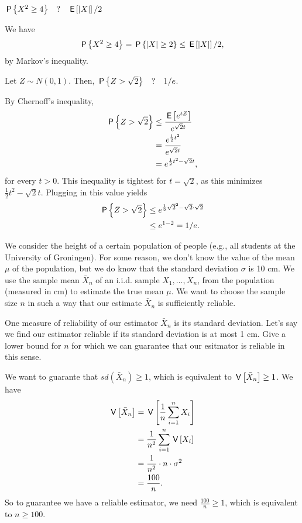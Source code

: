 \documentclass[lectures]{subfiles}
\begin{document}
\begin{exercise}
$\P{X^2 \geq 4} \quad?\quad \E{|X|}/2$
\begin{solution}
We have
\begin{align}
    \P{X^2 \geq 4} = \P{|X| \geq 2} \leq \E{|X|}/2,
\end{align}
by Markov's inequality.
\end{solution}
\end{exercise}



\begin{exercise}
Let $Z \sim N(0,1)$. Then, $\P{Z > \sqrt{2}} \quad?\quad 1/e$.
\begin{solution}
By Chernoff's inequality,
\begin{align}
    \P{Z > \sqrt{2}} &\leq \frac{\E{e^{tZ}}}{e^{\sqrt{2}t}} \\
    &= \frac{e^{\frac{1}{2}t^2}}{e^{\sqrt{2}t}} \\
    &= e^{\frac{1}{2}t^2 - \sqrt{2}t},
\end{align}
for every $t > 0$. This inequality is tightest for $t = \sqrt{2}$, as this minimizes $\frac{1}{2}t^2 - \sqrt{2}t$. Plugging in this value yields
\begin{align}
    \P{Z > \sqrt{2}} &\leq e^{\frac{1}{2}\sqrt{2}^2 - \sqrt{2}\cdot \sqrt{2}}\\
    &\leq e^{1 - 2} = 1/e.
\end{align}
\end{solution}
\end{exercise}


We consider the height of a certain population of people (e.g., all students at the University of Groningen). For some reason, we don't know the value of the mean $\mu$ of the population, but we do know that the standard deviation $\sigma$ is 10 cm. We use the sample mean $\bar{X}_n$ of an i.i.d. sample $X_1, \ldots, X_n$, from the population (measured in cm) to estimate the true mean $\mu$.  We want to choose the sample size $n$ in such a way that our estimate $\bar{X}_n$ is sufficiently reliable.

\begin{exercise}
One measure of reliability of our estimator $\bar{X}_n$ is its standard deviation. Let's say we find our estimator reliable if its standard deviation is at most 1 cm. Give a lower bound for $n$ for which we can guarantee that our esitmator is reliable in this sense.
\begin{solution}
We want to guarante that $sd(\bar{X}_n) \geq 1$, which is equivalent to $\V{\bar{X}_n} \geq 1$. We have
\begin{align}
    \V{\bar{X}_n} &= \V{\frac{1}{n}\sum_{i=1}^n X_i} \\
    &= \frac{1}{n^2} \sum_{i=1}^n \V{X_i} \\
    &= \frac{1}{n^2} \cdot n \cdot \sigma^2 \\
    &= \frac{100}{n}.
\end{align}
So to guarantee we have a reliable estimator, we need $\frac{100}{n} \geq 1$, which is equivalent to $n \geq 100$.
\end{solution}
\end{exercise}
\end{document}
